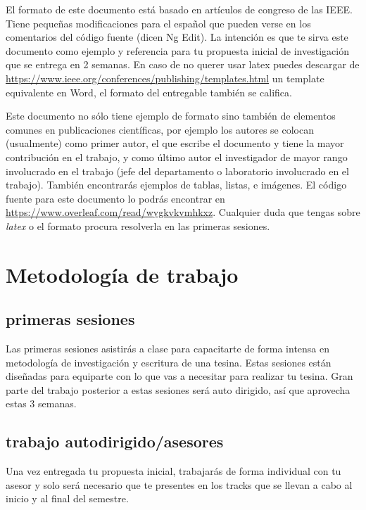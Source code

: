 \documentclass[letterpaper, 10 pt, conference]{ieeeconf}  %
\begin{document}
El formato de este documento está basado en artículos de congreso de las IEEE. Tiene pequeñas modificaciones para el español que pueden verse en los comentarios del código fuente (dicen Ng Edit). La intención es que te sirva este documento como ejemplo y referencia para tu propuesta inicial de investigación que se entrega en 2 semanas. En caso de no querer usar latex puedes descargar de \url{https://www.ieee.org/conferences/publishing/templates.html}  un template equivalente en Word, el formato del entregable también se califica. 

Este documento no sólo tiene ejemplo de formato sino también de elementos comunes en publicaciones científicas, por ejemplo los autores se colocan (usualmente) como primer autor, el que escribe el documento y tiene la mayor contribución en el trabajo, y como último autor el investigador de mayor rango involucrado en el trabajo (jefe del departamento o laboratorio involucrado en el trabajo). También  encontrarás ejemplos de tablas, listas, e imágenes. El código fuente para este documento lo podrás encontrar en \url{https://www.overleaf.com/read/wygkvkvmhkxz}. Cualquier duda que tengas sobre \textit{latex} o el formato procura resolverla en las primeras sesiones.  


\section{Metodología de trabajo}

\subsection{primeras sesiones}
Las primeras sesiones asistirás a clase para capacitarte de forma intensa en metodología de investigación y escritura de una tesina. Estas sesiones están diseñadas para equiparte con lo que vas a necesitar para realizar tu tesina. Gran parte del trabajo posterior a estas sesiones será auto dirigido, así que aprovecha estas 3 semanas.\\
\subsection{trabajo autodirigido/asesores}
Una vez entregada tu propuesta inicial, trabajarás de forma individual con tu asesor y solo será necesario que te presentes en los tracks que se llevan a cabo al inicio y al final del semestre.\\ 
\end{document}
